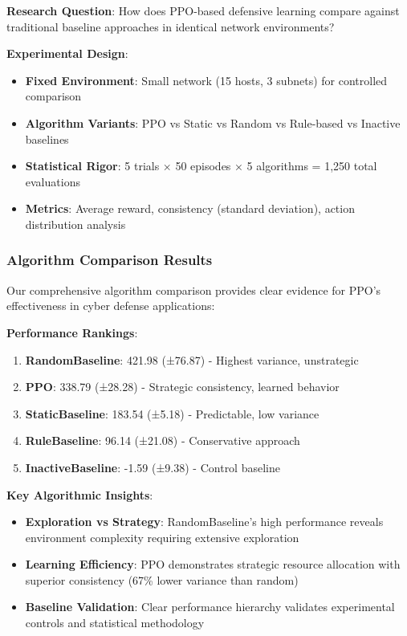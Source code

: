 \documentclass[12pt,oneside]{article}
\begin{document}
\textbf{Research Question}: How does PPO-based defensive learning compare against traditional baseline approaches in identical network environments?

\textbf{Experimental Design}:
\begin{itemize}
\item \textbf{Fixed Environment}: Small network (15 hosts, 3 subnets) for controlled comparison
\item \textbf{Algorithm Variants}: PPO vs Static vs Random vs Rule-based vs Inactive baselines
\item \textbf{Statistical Rigor}: 5 trials × 50 episodes × 5 algorithms = 1,250 total evaluations
\item \textbf{Metrics}: Average reward, consistency (standard deviation), action distribution analysis
\end{itemize}

\subsubsection{Algorithm Comparison Results}

Our comprehensive algorithm comparison provides clear evidence for PPO's effectiveness in cyber defense applications:

\textbf{Performance Rankings}:
\begin{enumerate}
\item \textbf{RandomBaseline}: 421.98 (±76.87) - Highest variance, unstrategic
\item \textbf{PPO}: 338.79 (±28.28) - Strategic consistency, learned behavior  
\item \textbf{StaticBaseline}: 183.54 (±5.18) - Predictable, low variance
\item \textbf{RuleBaseline}: 96.14 (±21.08) - Conservative approach
\item \textbf{InactiveBaseline}: -1.59 (±9.38) - Control baseline
\end{enumerate}

\textbf{Key Algorithmic Insights}:
\begin{itemize}
\item \textbf{Exploration vs Strategy}: RandomBaseline's high performance reveals environment complexity requiring extensive exploration
\item \textbf{Learning Efficiency}: PPO demonstrates strategic resource allocation with superior consistency (67\% lower variance than random)
\item \textbf{Baseline Validation}: Clear performance hierarchy validates experimental controls and statistical methodology
\end{itemize}
\end{document}
